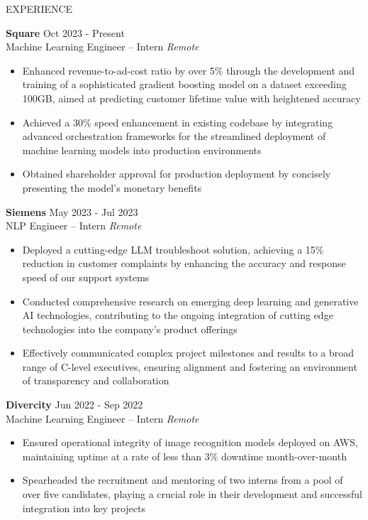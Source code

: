 \documentclass{resume} %
\begin{document}
\begin{rSection}{EXPERIENCE}

    \textbf{Square} \hfill Oct 2023 - Present\\
    Machine Learning Engineer -- Intern \hfill \textit{Remote}
     \begin{itemize}
        \itemsep -3pt {} 
        \item Enhanced revenue-to-ad-cost ratio by over 5\% through the development and training of a sophisticated gradient boosting model on a dataset exceeding 100GB, aimed at predicting customer lifetime value with heightened accuracy
        \item Achieved a 30\% speed enhancement in existing codebase by integrating advanced orchestration frameworks for the streamlined deployment of machine learning models into production environments
        \item Obtained shareholder approval for production deployment by concisely presenting the model's monetary benefits
     \end{itemize}
     
    \textbf{Siemens} \hfill May 2023 - Jul 2023\\
    NLP Engineer -- Intern \hfill \textit{Remote}
     \begin{itemize}
        \itemsep -3pt {} 
        \item Deployed a cutting-edge LLM troubleshoot solution, achieving a 15\% reduction in customer complaints by enhancing the accuracy and response speed of our support systems
        \item Conducted comprehensive research on emerging deep learning and generative AI technologies, contributing to the ongoing integration of cutting edge technologies into the company's product offerings
        \item Effectively communicated complex project milestones and results to a broad range of C-level executives, ensuring alignment and fostering an environment of transparency and collaboration
     \end{itemize}
    
    \textbf{Divercity} \hfill Jun 2022 - Sep 2022\\
    Machine Learning Engineer -- Intern \hfill \textit{Remote}
     \begin{itemize}
        \itemsep -3pt {} 
        \item Ensured operational integrity of image recognition models deployed on AWS, maintaining uptime at a rate of less than 3\% downtime month-over-month
        \item Spearheaded the recruitment and mentoring of two interns from a pool of over five candidates, playing a crucial role in their development and successful integration into key projects
     \end{itemize}
    
    \end{rSection}
    
\end{document}
